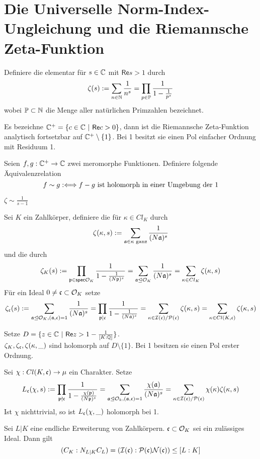 \chapter{Die Universelle Norm-Index-Ungleichung und die Riemannsche Zeta-Funktion}

\newcommand{\Pb}{\mathbb{P}}

Definiere die  elementar für $s \in \mathbb{C}$ mit $\textsf{Re} s > 1$ durch
\[ \zeta(s) := \sum_{n\in \N} \frac{1}{n^s} = \prod_{p \in \Pb} \frac{1}{1 - \frac{1}{p^s}}  \]
wobei $\Pb \subset \N$ die Menge aller natürlichen Primzahlen bezeichnet.

\Satz{}
Es bezeichne $\C^+ = \set{c \in \C}{\textsf{Re} c > 0}$, dann ist die Riemannsche Zeta-Funktion analytisch fortsetzbar auf $\mathbb{C}^+\setminus\{1\}$. Bei 1 besitzt sie einen Pol einfacher Ordnung mit Residuum 1.

\Def{}
Seien $f,g : \mathbb{C}^+ \overset{}{\rightarrow} \mathbb{C}$ zwei meromorphe Funktionen. Definiere folgende Äquivalenzrelation
\[ f \sim g :\overset{}{\Longleftrightarrow} f - g \text{ ist holomorph in einer Umgebung der 1} \]

\Kor{}
$\zeta \sim \frac{1}{s-1}$

Sei $K$ ein Zahlkörper, definiere die  für $\kappa \in Cl_K$ durch
\[ \zeta(\kappa, s) := \sum_{\mathfrak{a} \in \kappa \text{ ganz}}\frac{1}{(N\mathfrak{a})^s} \]
und die  durch
\[ \zeta_K(s) := \prod_{\mathfrak{p} \in \textsf{spec}\mathcal{O}_K} \frac{1}{1 - \frac{1}{(N\mathfrak{p})^s}} = \sum_{\mathfrak{a} \trianglelefteq \mathcal{O}_K} \frac{1}{(N\mathfrak{a})^s} = \sum_{\kappa \in Cl_K} \zeta(\kappa, s) \]
Für ein Ideal $0\neq \mathfrak{c} \subset \mathcal{O}_K$ setze
\[ \zeta_{\mathfrak{c}} (s) :=  \sum_{\mathfrak{a} \trianglelefteq \mathcal{O}_K, (\mathfrak{a},\mathfrak{c}) = 1} \frac{1}{(N\mathfrak{a})^s} = \prod_{\mathfrak{p} | \mathfrak{c}} \frac{1}{1 - \frac{1}{(N\mathfrak{a})^s}} = \sum_{\kappa \in \mathcal{I}(\mathfrak{c}) / \mathcal{P}(\mathfrak{c})} \zeta(\kappa, s) = \sum_{\kappa \in Cl(K,\mathfrak{c})} \zeta(\kappa, s) \]

\Satz{}
Setze $D = \{ z \in \mathbb{C} ~|~ \textsf{Re}z > 1 - \frac{1}{[K:\mathbb{Q}]} \}$.\\
$\zeta_K, \zeta_{\mathfrak{c}}, \zeta(\kappa, \_)$ sind holomorph auf $D\setminus \{1\}$. Bei 1 besitzen sie einen Pol erster Ordnung.

\Satz{}
Sei $\chi : Cl(K,\mathfrak{c}) \overset{}{\rightarrow} \mu$ ein Charakter. Setze
\[ L_{\mathfrak{c}} (\chi, s) := \prod_{\mathfrak{p} \nmid \mathfrak{c}} \frac{1}{1 - \frac{\chi(\mathfrak{p})}{ (N\mathfrak{p})^s }} = \sum_{\mathfrak{a} \trianglelefteq \mathcal{O}_k, (\mathfrak{a},\mathfrak{c}) = 1} \frac{\chi(\mathfrak{a})}{(N\mathfrak{a})^s} = \sum_{\kappa \in \mathcal{I}(\mathfrak{c})/ \mathcal{P}(\mathfrak{c}) }\chi(\kappa) \zeta(\kappa, s) \]
Ist $\chi$ nichttrivial, so ist $L_{\mathfrak{c}}(\chi, \_)$ holomorph bei 1.

Sei $L|K$ eine endliche Erweiterung von Zahlkörpern. $\mathfrak{c} \subset \mathcal{O}_K$ sei ein zulässiges Ideal. Dann gilt
\[ (C_K : N_{L|K} C_L) = (\mathcal{I}(\mathfrak{c}) : \mathcal{P}(\mathfrak{c}) \mathcal{N}(\mathfrak{c}) ) \leq [L:K]  \]
